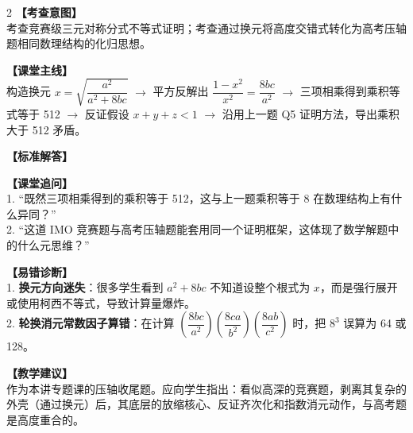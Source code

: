 \documentclass[12pt,a4paper]{ctexart}
\begin{document}
\begin{paracol}{2}
  \textbf{【考查意图】}\\
  考查竞赛级三元对称分式不等式证明；考查通过换元将高度交错式转化为高考压轴题相同数理结构的化归思想。
  
  \textbf{【课堂主线】}\\
  构造换元 \(x = \sqrt{\dfrac{a^2}{a^2+8bc}}\) \(\to\) 平方反解出 \(\dfrac{1-x^2}{x^2} = \dfrac{8bc}{a^2}\) \(\to\) 三项相乘得到乘积等式等于 512 \(\to\) 反证假设 \(x+y+z < 1\) \(\to\) 沿用上一题 Q5 证明方法，导出乘积大于 512 矛盾。
  
  \textbf{【标准解答】}\\
  \qSixSolution
  
  \textbf{【课堂追问】}\\
  1. “既然三项相乘得到的乘积等于 512，这与上一题乘积等于 8 在数理结构上有什么异同？”\\
  2. “这道 IMO 竞赛题与高考压轴题能套用同一个证明框架，这体现了数学解题中的什么元思维？”
  
  \switchcolumn
  \textbf{【易错诊断】}\\
  1. \textbf{换元方向迷失}：很多学生看到 \(a^2 + 8bc\) 不知道设整个根式为 \(x\)，而是强行展开或使用柯西不等式，导致计算量爆炸。\\
  2. \textbf{轮换消元常数因子算错}：在计算 \(\left(\dfrac{8bc}{a^2}\right)\left(\dfrac{8ca}{b^2}\right)\left(\dfrac{8ab}{c^2}\right)\) 时，把 \(8^3\) 误算为 64 或 128。
  
  \textbf{【教学建议】}\\
  作为本讲专题课的压轴收尾题。应向学生指出：看似高深的竞赛题，剥离其复杂的外壳（通过换元）后，其底层的放缩核心、反证齐次化和指数消元动作，与高考题是高度重合的。
\end{paracol}

\vspace{0.8em}
\par{}
\vspace{0.8em}

\qSevenStem
\end{document}
